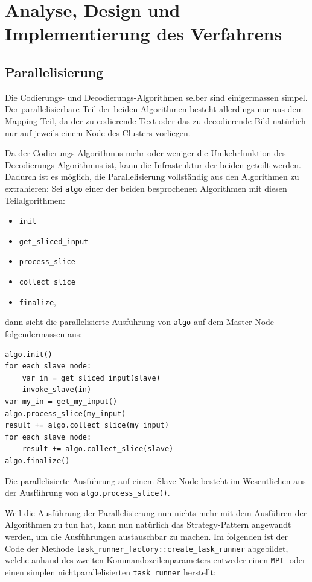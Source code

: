 \documentclass[11pt]{scrreprt} %
\theoremstyle{definition}
\begin{document}
\chapter{Analyse, Design und Implementierung des Verfahrens}

\section{Parallelisierung}

Die Codierungs- und Decodierungs-Algorithmen selber sind einigermassen simpel. Der parallelisierbare Teil der beiden Algorithmen besteht allerdings nur aus dem Mapping-Teil, da der zu codierende Text oder das zu decodierende Bild natürlich nur auf jeweils einem Node des Clusters vorliegen.

Da der Codierungs-Algorithmus mehr oder weniger die Umkehrfunktion des Decodierungs-Algorithmus ist, kann die Infrastruktur der beiden geteilt werden. Dadurch ist es möglich, die Parallelisierung vollständig aus den Algorithmen zu extrahieren: Sei {\tt algo} einer der beiden besprochenen Algorithmen mit diesen Teilalgorithmen:
\begin{itemize}
\item {\tt init}
\item {\tt get\_sliced\_input}
\item {\tt process\_slice}
\item {\tt collect\_slice}
\item {\tt finalize},
\end{itemize}

dann sieht die parallelisierte Ausführung von {\tt algo} auf dem Master-Node folgendermassen aus:

\begin{verbatim}
algo.init()
for each slave node:
    var in = get_sliced_input(slave)
    invoke_slave(in)
var my_in = get_my_input()
algo.process_slice(my_input)
result += algo.collect_slice(my_input)
for each slave node:
    result += algo.collect_slice(slave)
algo.finalize()
\end{verbatim}

Die parallelisierte Ausführung auf einem Slave-Node besteht im Wesentlichen aus der Ausführung von {\tt algo.process\_slice()}.

Weil die Ausführung der Parallelisierung nun nichts mehr mit dem Ausführen der Algorithmen zu tun hat, kann nun natürlich das Strategy-Pattern angewandt werden, um die Ausführungen austauschbar zu machen. Im folgenden ist der Code der Methode {\tt task\_runner\_factory::create\_task\_runner} abgebildet, welche anhand des zweiten Kommandozeilenparameters entweder einen {\tt MPI}- oder einen simplen nichtparallelisierten {\tt task\_runner} herstellt:
\end{document}

